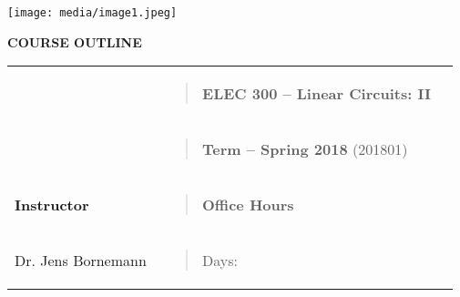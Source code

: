 \texttt{[image: media/image1.jpeg]}

\textbf{COURSE OUTLINE}

\begin{longtable}[]{@{}lll@{}}
\toprule
\begin{minipage}[t]{0.32\columnwidth}\raggedright\strut
\strut
\end{minipage} & \begin{minipage}[t]{0.32\columnwidth}\raggedright\strut
\begin{quote}
\textbf{ELEC 300 -- Linear Circuits: II}
\end{quote}\strut
\end{minipage} & \begin{minipage}[t]{0.32\columnwidth}\raggedright\strut
\strut
\end{minipage}\tabularnewline
\begin{minipage}[t]{0.32\columnwidth}\raggedright\strut
\strut
\end{minipage} & \begin{minipage}[t]{0.32\columnwidth}\raggedright\strut
\begin{quote}
\textbf{Term -- Spring 2018} (201801)
\end{quote}\strut
\end{minipage} & \begin{minipage}[t]{0.32\columnwidth}\raggedright\strut
\strut
\end{minipage}\tabularnewline
\begin{minipage}[t]{0.32\columnwidth}\raggedright\strut
\textbf{Instructor}\strut
\end{minipage} & \begin{minipage}[t]{0.32\columnwidth}\raggedright\strut
\begin{quote}
\textbf{Office Hours}
\end{quote}\strut
\end{minipage} & \begin{minipage}[t]{0.32\columnwidth}\raggedright\strut
\strut
\end{minipage}\tabularnewline
\begin{minipage}[t]{0.32\columnwidth}\raggedright\strut
Dr. Jens Bornemann\strut
\end{minipage} & \begin{minipage}[t]{0.32\columnwidth}\raggedright\strut
\begin{quote}
Days:
\end{quote}\strut
\end{minipage} & \begin{minipage}[t]{0.32\columnwidth}\raggedright\strut

\end{minipage}
\end{longtable}
